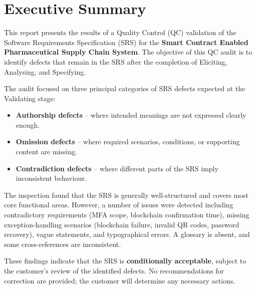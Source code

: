 \documentclass[11pt,a4paper]{article}
\begin{document}
\noindent{}

\bigskip

\section{Executive Summary}

This report presents the results of a Quality Control (QC) validation of the Software Requirements Specification (SRS) for the \textbf{Smart Contract Enabled Pharmaceutical Supply Chain System}. The objective of this QC audit is to identify defects that remain in the SRS after the completion of Eliciting, Analysing, and Specifying.

The audit focused on three principal categories of SRS defects expected at the Validating stage:
\begin{itemize}[leftmargin=*]
\item \textbf{Authorship defects} -- where intended meanings are not expressed clearly enough.
\item \textbf{Omission defects} -- where required scenarios, conditions, or supporting content are missing.
\item \textbf{Contradiction defects} -- where different parts of the SRS imply inconsistent behaviour.
\end{itemize}

The inspection found that the SRS is generally well-structured and covers most core functional areas. However, a number of issues were detected including contradictory requirements (MFA scope, blockchain confirmation time), missing exception-handling scenarios (blockchain failure, invalid QR codes, password recovery), vague statements, and typographical errors. A glossary is absent, and some cross-references are inconsistent.

These findings indicate that the SRS is \textbf{conditionally acceptable}, subject to the customer's review of the identified defects. No recommendations for correction are provided; the customer will determine any necessary actions.
\end{document}
